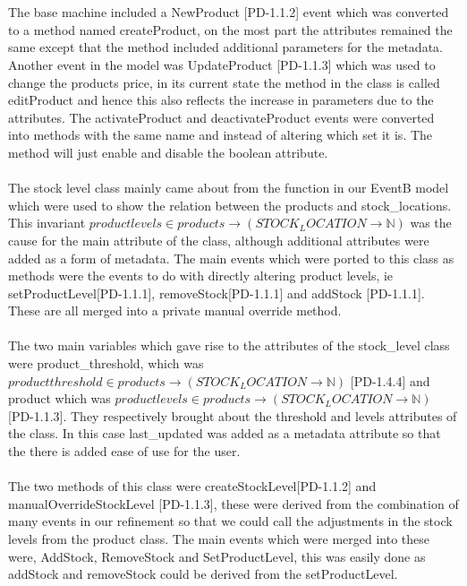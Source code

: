 \documentclass[a4paper]{article}
\begin{document}
\\\\
The base machine included a NewProduct [PD-1.1.2] event which was converted to a method named createProduct, on the most part the attributes remained the same except that the method included additional parameters for the metadata. Another event in the model was UpdateProduct  [PD-1.1.3] which was used to change the products price, in its current state the  method in the class is called editProduct and hence this also reflects the increase in parameters due to the attributes. The activateProduct and deactivateProduct events were converted into methods with the same name and instead of altering which set it is. The method will just enable and disable the boolean attribute.
\\\\
The stock level class mainly came about from the function in our EventB model which were used to show the relation between the products and stock\_locations. This invariant \(productlevels ∈ products →(STOCK_LOCATION → ℕ) \) was the cause for the main attribute of the class, although additional attributes were added as a form of metadata. The main events which were ported to this class as methods were the events to do with directly altering product levels, ie setProductLevel[PD-1.1.1], removeStock[PD-1.1.1] and addStock [PD-1.1.1]. These are all merged into a private manual override method.
\\\\
The two main variables which gave rise to the attributes of the stock\_level class were product\_threshold, which was \(productthreshold ∈ products → (STOCK_LOCATION → ℕ) \) [PD-1.4.4] and product which was \( productlevels ∈ products →(STOCK_LOCATION → ℕ) \) [PD-1.1.3]. They respectively brought about the threshold and levels attributes of the class. In this case last\_updated was added as a metadata attribute so that the there is added ease of use for the user. 
\\\\
The two methods of this class were createStockLevel[PD-1.1.2] and manualOverrideStockLevel [PD-1.1.3], these were derived from the combination of many events in our refinement so that we could call the adjustments in the stock levels from the product class. The main events which were merged into these were, AddStock, RemoveStock and SetProductLevel, this was easily done as addStock and removeStock could be derived from the setProductLevel. 
\\\\
\end{document}
